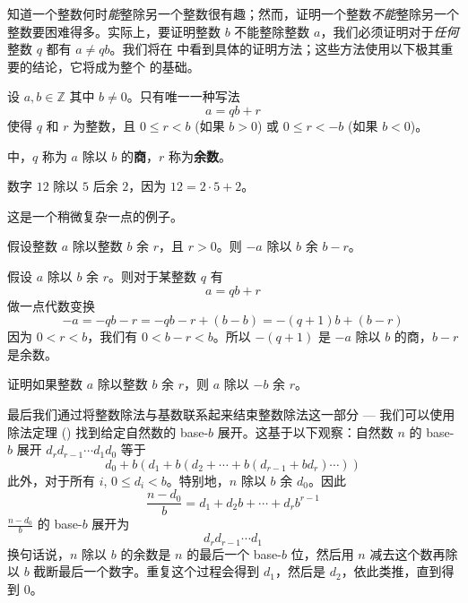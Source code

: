 知道一个整数何时\textit{能}整除另一个整数很有趣；然而，证明一个整数\textit{不能}整除另一个整数要困难得多。实际上，要证明整数 $b$ 不能整除整数 $a$，我们必须证明对于\textit{任何}整数 $q$ 都有 $a \ne qb$。我们将在  中看到具体的证明方法；这些方法使用以下极其重要的结论，它将成为整个  的基础。

\begin{theorem}
\label{thmDivisionPreliminary}
设 $a,b \in \mathbb{Z}$ 其中 $b \ne 0$。只有唯一一种写法
\[ a = qb + r \]
使得 $q$ 和 $r$ 为整数，且 $0 \le r < b$ (如果 $b > 0$) 或 $0 \le r < -b$ (如果 $b < 0$)。
\end{theorem}

中，$q$ 称为 $a$ 除以 $b$ 的\textbf{商}，$r$ 称为\textbf{余数}。

\begin{example}
数字 $12$ 除以 $5$ 后余 $2$，因为 $12 = 2 \cdot 5 + 2$。
\end{example}

这是一个稍微复杂一点的例子。

\begin{proposition}
假设整数 $a$ 除以整数 $b$ 余 $r$，且 $r>0$。则 $-a$ 除以 $b$ 余 $b-r$。
\end{proposition}

\begin{cproof}
假设 $a$ 除以 $b$ 余 $r$。则对于某整数 $q$ 有
\[ a=qb+r \]
做一点代数变换
\[ -a = -qb-r = -qb-r+(b-b) = -(q+1)b + (b-r) \]
因为 $0<r<b$，我们有 $0<b-r<b$。所以 $-(q+1)$ 是 $-a$ 除以 $b$ 的商，$b-r$ 是余数。
\end{cproof}

\begin{exercise}
证明如果整数 $a$ 除以整数 $b$ 余 $r$，则 $a$ 除以 $-b$ 余 $r$。
\end{exercise}

最后我们通过将整数除法与基数联系起来结束整数除法这一部分 --- 我们可以使用除法定理 () 找到给定自然数的 base-$b$ 展开。这基于以下观察：自然数 $n$ 的 base-$b$ 展开 $d_rd_{r-1} \cdots d_1 d_0$ 等于
\[ d_0 + b(d_1 + b(d_2 + \cdots + b(d_{r-1} + bd_r) \cdots)) \]
此外，对于所有 $i$, $0 \le d_i < b$。特别地，$n$ 除以 $b$ 余 $d_0$。因此
\[ \frac{n-d_0}{b} = d_1 + d_2b + \cdots + d_rb^{r-1} \]
$\frac{n-d_0}{b}$ 的 base-$b$ 展开为
\[ d_rd_{r-1} \cdots d_1 \]
换句话说，$n$ 除以 $b$ 的余数是 $n$ 的最后一个 base-$b$ 位，然后用 $n$ 减去这个数再除以 $b$ 截断最后一个数字。重复这个过程会得到 $d_1$，然后是 $d_2$，依此类推，直到得到 $0$。

